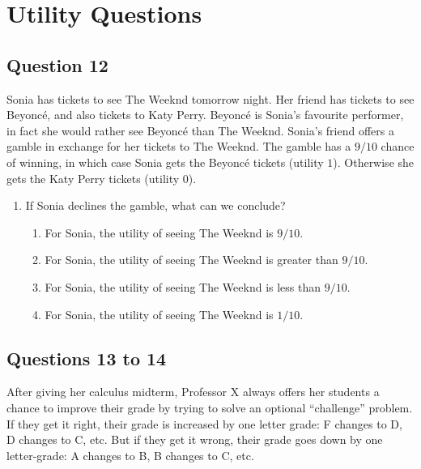 \documentclass[11pt,]{article}
\providecommand{\tightlist}{%
  \setlength{\itemsep}{0pt}\setlength{\parskip}{0pt}}
\begin{document}
\hypertarget{utility-questions}{%
\section{Utility Questions}\label{utility-questions}}

\hypertarget{question-12}{%
\subsection{Question 12}\label{question-12}}

Sonia has tickets to see The Weeknd tomorrow night. Her friend has
tickets to see Beyoncé, and also tickets to Katy Perry. Beyoncé is
Sonia's favourite performer, in fact she would rather see Beyoncé than
The Weeknd. Sonia's friend offers a gamble in exchange for her tickets
to The Weeknd. The gamble has a \(9/10\) chance of winning, in which
case Sonia gets the Beyoncé tickets (utility \(1\)). Otherwise she gets
the Katy Perry tickets (utility \(0\)).

\begin{enumerate}
\def\labelenumi{\arabic{enumi}.}
\setcounter{enumi}{11}
\item
  If Sonia declines the gamble, what can we conclude?

  \begin{enumerate}
  \def\labelenumii{\alph{enumii}.}
  \tightlist
  \item
    For Sonia, the utility of seeing The Weeknd is \(9/10\).
  \item
    For Sonia, the utility of seeing The Weeknd is greater than
    \(9/10\).
  \item
    For Sonia, the utility of seeing The Weeknd is less than \(9/10\).
  \item
    For Sonia, the utility of seeing The Weeknd is \(1/10\).
  \end{enumerate}
\end{enumerate}

\hypertarget{questions-13-to-14}{%
\subsection{Questions 13 to 14}\label{questions-13-to-14}}

After giving her calculus midterm, Professor X always offers her
students a chance to improve their grade by trying to solve an optional
``challenge'' problem. If they get it right, their grade is increased by
one letter grade: F changes to D, D changes to C, etc. But if they get
it wrong, their grade goes down by one letter-grade: A changes to B, B
changes to C, etc.
\end{document}
